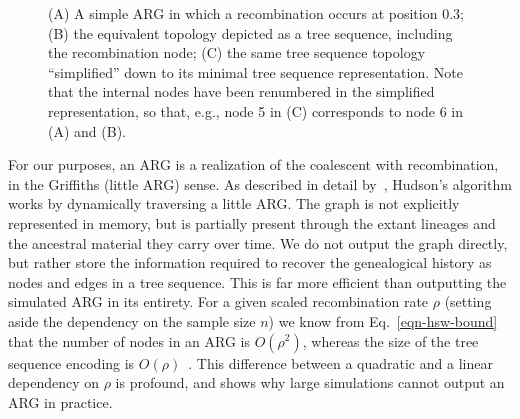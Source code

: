 \documentclass[9pt,twocolumn,twoside,lineno]{gsajnl}
\begin{document}
\begin{figure}
\begin{subfigure}[t]{0.33\columnwidth}
\end{subfigure}
\caption{\label{fig-arg} (A) A simple ARG in which a recombination
occurs at position 0.3; (B) the equivalent topology depicted as a tree
sequence, including the recombination node; (C) the same tree sequence
topology ``simplified'' down to its minimal tree sequence representation.
Note that the internal nodes have been renumbered in the simplified
representation, so that, e.g., node 5 in (C) corresponds to node 6 in
(A) and (B).}
\end{figure}

For our purposes, an ARG is a realization of the coalescent with
recombination, in the Griffiths (little ARG) sense.
As described in detail by~\cite{kelleher2016efficient}, Hudson's algorithm
works by dynamically traversing a little ARG.
The graph is not explicitly represented in memory, but is partially
present through the extant lineages and the ancestral material they carry
over time. We do not output the graph directly, but
rather store the information required to recover the genealogical
history as nodes and edges in a tree sequence.
This is far more efficient than outputting the simulated ARG in its entirety.
For a given scaled recombination rate $\rho$
(setting aside the dependency on the sample size $n$)
we know from Eq.~\eqref{eqn-hsw-bound} that the number of nodes
in an ARG is $O(\rho^2)$,
whereas the size of the tree sequence encoding is
$O(\rho)$~\citep{kelleher2016efficient}.
This difference between a
quadratic and a linear dependency on $\rho$ is profound, and shows why
large simulations cannot output an ARG in practice.
\end{document}
